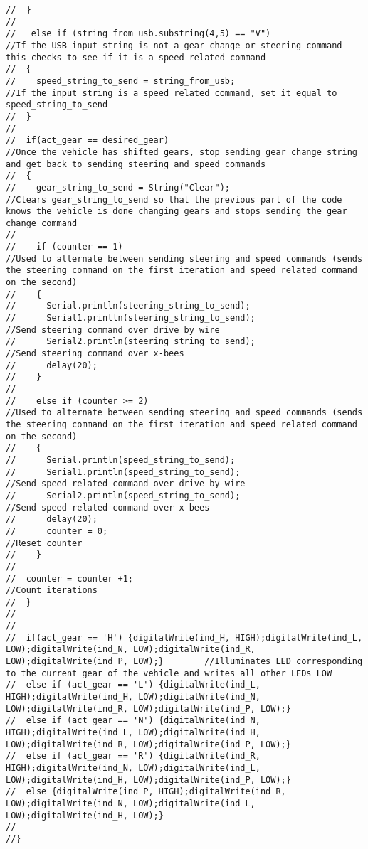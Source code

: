 \begin{lstlisting}[breaklines=true,basicstyle=\tiny]
//  }
//  
//   else if (string_from_usb.substring(4,5) == "V")                                   //If the USB input string is not a gear change or steering command this checks to see if it is a speed related command 
//  {
//    speed_string_to_send = string_from_usb;                                          //If the input string is a speed related command, set it equal to speed_string_to_send
//  }
//  
//  if(act_gear == desired_gear)                                                       //Once the vehicle has shifted gears, stop sending gear change string and get back to sending steering and speed commands
//  {
//    gear_string_to_send = String("Clear");                                           //Clears gear_string_to_send so that the previous part of the code knows the vehicle is done changing gears and stops sending the gear change command
//    
//    if (counter == 1)                                                                //Used to alternate between sending steering and speed commands (sends the steering command on the first iteration and speed related command on the second)
//    {
//      Serial.println(steering_string_to_send);
//      Serial1.println(steering_string_to_send);                                      //Send steering command over drive by wire
//      Serial2.println(steering_string_to_send);                                      //Send steering command over x-bees
//      delay(20);
//    }
//    
//    else if (counter >= 2)                                                           //Used to alternate between sending steering and speed commands (sends the steering command on the first iteration and speed related command on the second)
//    {
//      Serial.println(speed_string_to_send);
//      Serial1.println(speed_string_to_send);                                         //Send speed related command over drive by wire
//      Serial2.println(speed_string_to_send);                                         //Send speed related command over x-bees
//      delay(20);
//      counter = 0;                                                                   //Reset counter
//    }
//      
//  counter = counter +1;                                                              //Count iterations
//  }
//
// 
//  if(act_gear == 'H') {digitalWrite(ind_H, HIGH);digitalWrite(ind_L, LOW);digitalWrite(ind_N, LOW);digitalWrite(ind_R, LOW);digitalWrite(ind_P, LOW);}        //Illuminates LED corresponding to the current gear of the vehicle and writes all other LEDs LOW
//  else if (act_gear == 'L') {digitalWrite(ind_L, HIGH);digitalWrite(ind_H, LOW);digitalWrite(ind_N, LOW);digitalWrite(ind_R, LOW);digitalWrite(ind_P, LOW);}
//  else if (act_gear == 'N') {digitalWrite(ind_N, HIGH);digitalWrite(ind_L, LOW);digitalWrite(ind_H, LOW);digitalWrite(ind_R, LOW);digitalWrite(ind_P, LOW);}
//  else if (act_gear == 'R') {digitalWrite(ind_R, HIGH);digitalWrite(ind_N, LOW);digitalWrite(ind_L, LOW);digitalWrite(ind_H, LOW);digitalWrite(ind_P, LOW);}
//  else {digitalWrite(ind_P, HIGH);digitalWrite(ind_R, LOW);digitalWrite(ind_N, LOW);digitalWrite(ind_L, LOW);digitalWrite(ind_H, LOW);} 
//
//}


\end{lstlisting}
